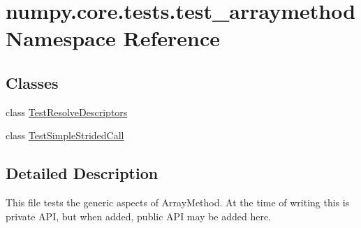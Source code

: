 \hypertarget{namespacenumpy_1_1core_1_1tests_1_1test__arraymethod}{}\section{numpy.\+core.\+tests.\+test\+\_\+arraymethod Namespace Reference}
\label{namespacenumpy_1_1core_1_1tests_1_1test__arraymethod}
\subsection*{Classes}
\begin{DoxyCompactItemize}
\item 
class \hyperlink{classnumpy_1_1core_1_1tests_1_1test__arraymethod_1_1TestResolveDescriptors}{Test\+Resolve\+Descriptors}
\item 
class \hyperlink{classnumpy_1_1core_1_1tests_1_1test__arraymethod_1_1TestSimpleStridedCall}{Test\+Simple\+Strided\+Call}
\end{DoxyCompactItemize}


\subsection{Detailed Description}
\begin{DoxyVerb}This file tests the generic aspects of ArrayMethod.  At the time of writing
this is private API, but when added, public API may be added here.
\end{DoxyVerb}
 